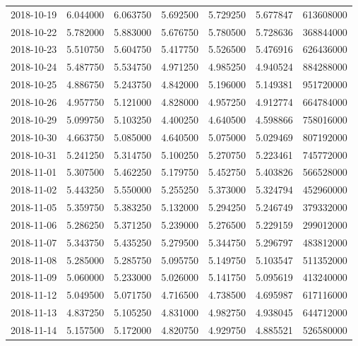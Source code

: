 \begin{tabular}{lrrrrrr}
2018-10-19 &    6.044000 &    6.063750 &    5.692500 &    5.729250 &    5.677847 &   613608000 \\
2018-10-22 &    5.782000 &    5.883000 &    5.676750 &    5.780500 &    5.728636 &   368844000 \\
2018-10-23 &    5.510750 &    5.604750 &    5.417750 &    5.526500 &    5.476916 &   626436000 \\
2018-10-24 &    5.487750 &    5.534750 &    4.971250 &    4.985250 &    4.940524 &   884288000 \\
2018-10-25 &    4.886750 &    5.243750 &    4.842000 &    5.196000 &    5.149381 &   951720000 \\
2018-10-26 &    4.957750 &    5.121000 &    4.828000 &    4.957250 &    4.912774 &   664784000 \\
2018-10-29 &    5.099750 &    5.103250 &    4.400250 &    4.640500 &    4.598866 &   758016000 \\
2018-10-30 &    4.663750 &    5.085000 &    4.640500 &    5.075000 &    5.029469 &   807192000 \\
2018-10-31 &    5.241250 &    5.314750 &    5.100250 &    5.270750 &    5.223461 &   745772000 \\
2018-11-01 &    5.307500 &    5.462250 &    5.179750 &    5.452750 &    5.403826 &   566528000 \\
2018-11-02 &    5.443250 &    5.550000 &    5.255250 &    5.373000 &    5.324794 &   452960000 \\
2018-11-05 &    5.359750 &    5.383250 &    5.132000 &    5.294250 &    5.246749 &   379332000 \\
2018-11-06 &    5.286250 &    5.371250 &    5.239000 &    5.276500 &    5.229159 &   299012000 \\
2018-11-07 &    5.343750 &    5.435250 &    5.279500 &    5.344750 &    5.296797 &   483812000 \\
2018-11-08 &    5.285000 &    5.285750 &    5.095750 &    5.149750 &    5.103547 &   511352000 \\
2018-11-09 &    5.060000 &    5.233000 &    5.026000 &    5.141750 &    5.095619 &   413240000 \\
2018-11-12 &    5.049500 &    5.071750 &    4.716500 &    4.738500 &    4.695987 &   617116000 \\
2018-11-13 &    4.837250 &    5.105250 &    4.831000 &    4.982750 &    4.938045 &   644712000 \\
2018-11-14 &    5.157500 &    5.172000 &    4.820750 &    4.929750 &    4.885521 &   526580000 \\

\end{tabular}
